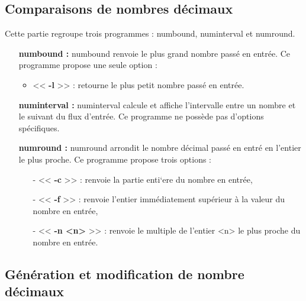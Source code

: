 \subsection{Comparaisons de nombres d\'ecimaux}

Cette partie regroupe trois programmes : numbound, numinterval et numround.
\newline
\begin{itemize}
 \item[\textbullet]  \textbf{numbound :} numbound renvoie le plus grand nombre pass\'e en entr\'ee.
Ce programme propose une seule option :
\begin{itemize}
  \item << \textbf{-l} >> : retourne le plus petit nombre pass\'e en entr\'ee.
\newline
\end{itemize}
 \item[\textbullet] \textbf{numinterval :} numinterval calcule et affiche l'intervalle entre un nombre et le suivant du flux d'entr\'ee.
Ce programme ne poss\`ede pas d'options sp\'ecifiques.
\newline{}
 \item[\textbullet] \textbf{numround :} numround arrondit le nombre d\'ecimal pass\'e en entr\'e en l'entier le plus proche.
Ce programme propose trois options :
\begin{itemize}
 \item[-] << \textbf{-c} >> : renvoie la partie enti`ere du nombre en entr\'ee,
 \item[-] << \textbf{-f} >> : renvoie l'entier imm\'ediatement sup\'erieur \`a la valeur du nombre en entr\'ee, 
 \item[-] << \textbf{-n <n>} >> : renvoie le multiple de l'entier <n> le plus proche du nombre en entr\'ee.
\end{itemize}
\end{itemize}

\subsection{G\'en\'eration et modification de nombre d\'ecimaux}

